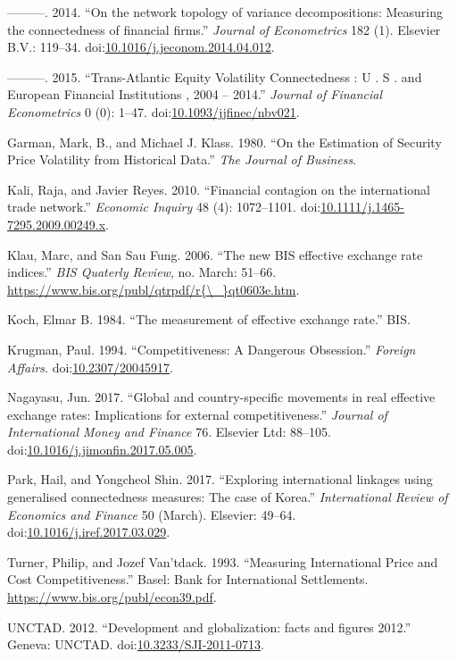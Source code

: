 \documentclass[]{elsarticle} %
\begin{document}
\hypertarget{ref-Diebold2014}{}
---------. 2014. ``On the network topology of variance decompositions:
Measuring the connectedness of financial firms.'' \emph{Journal of
Econometrics} 182 (1). Elsevier B.V.: 119--34.
doi:\href{https://doi.org/10.1016/j.jeconom.2014.04.012}{10.1016/j.jeconom.2014.04.012}.

\hypertarget{ref-Diebold2015}{}
---------. 2015. ``Trans-Atlantic Equity Volatility Connectedness : U .
S . and European Financial Institutions , 2004 -- 2014.'' \emph{Journal
of Financial Econometrics} 0 (0): 1--47.
doi:\href{https://doi.org/10.1093/jjfinec/nbv021}{10.1093/jjfinec/nbv021}.

\hypertarget{ref-Garman1980}{}
Garman, Mark, B., and Michael J. Klass. 1980. ``On the Estimation of
Security Price Volatility from Historical Data.'' \emph{The Journal of
Business}.

\hypertarget{ref-Kali2010}{}
Kali, Raja, and Javier Reyes. 2010. ``Financial contagion on the
international trade network.'' \emph{Economic Inquiry} 48 (4):
1072--1101.
doi:\href{https://doi.org/10.1111/j.1465-7295.2009.00249.x}{10.1111/j.1465-7295.2009.00249.x}.

\hypertarget{ref-Klau2006}{}
Klau, Marc, and San Sau Fung. 2006. ``The new BIS effective exchange
rate indices.'' \emph{BIS Quaterly Review}, no. March: 51--66.
\href{https://www.bis.org/publ/qtrpdf/r\%7B/_\%7Dqt0603e.htm}{https://www.bis.org/publ/qtrpdf/r\{\textbackslash{}\_\}qt0603e.htm}.

\hypertarget{ref-Koch1984}{}
Koch, Elmar B. 1984. ``The measurement of effective exchange rate.''
BIS.

\hypertarget{ref-Krugman1994}{}
Krugman, Paul. 1994. ``Competitiveness: A Dangerous Obsession.''
\emph{Foreign Affairs}.
doi:\href{https://doi.org/10.2307/20045917}{10.2307/20045917}.

\hypertarget{ref-Nagayasu2017}{}
Nagayasu, Jun. 2017. ``Global and country-specific movements in real
effective exchange rates: Implications for external competitiveness.''
\emph{Journal of International Money and Finance} 76. Elsevier Ltd:
88--105.
doi:\href{https://doi.org/10.1016/j.jimonfin.2017.05.005}{10.1016/j.jimonfin.2017.05.005}.

\hypertarget{ref-Park2017}{}
Park, Hail, and Yongcheol Shin. 2017. ``Exploring international linkages
using generalised connectedness measures: The case of Korea.''
\emph{International Review of Economics and Finance} 50 (March).
Elsevier: 49--64.
doi:\href{https://doi.org/10.1016/j.iref.2017.03.029}{10.1016/j.iref.2017.03.029}.

\hypertarget{ref-Turner1993}{}
Turner, Philip, and Jozef Van'tdack. 1993. ``Measuring International
Price and Cost Competitiveness.'' Basel: Bank for International
Settlements. \url{https://www.bis.org/publ/econ39.pdf}.

\hypertarget{ref-UNCTAD2012}{}
UNCTAD. 2012. ``Development and globalization: facts and figures 2012.''
Geneva: UNCTAD.
doi:\href{https://doi.org/10.3233/SJI-2011-0713}{10.3233/SJI-2011-0713}.
\end{document}
